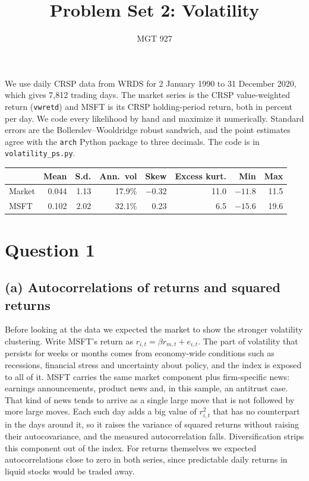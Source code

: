 \documentclass[11pt]{article}
\title{\textbf{Problem Set 2: Volatility}}
\author{MGT 927}  %
\date{}
\newcommand{\1}{\mathbf{1}}
\begin{document}
\maketitle
\vspace{-1.5em}

We use daily CRSP data from WRDS for 2 January 1990 to 31 December 2020, which gives 7,812
trading days. The market series is the CRSP value-weighted return (\texttt{vwretd}) and MSFT
is its CRSP holding-period return, both in percent per day. We code every likelihood by hand
and maximize it numerically. Standard errors are the Bollerslev--Wooldridge robust sandwich,
and the point estimates agree with the \texttt{arch} Python package to three decimals. The
code is in \texttt{volatility\_ps.py}.

\begin{center}
\small
\begin{tabular}{lrrrrrrr}
\toprule
 & Mean & S.d. & Ann.\ vol & Skew & Excess kurt. & Min & Max \\
\midrule
Market & 0.044 & 1.13 & 17.9\% & $-0.32$ & 11.0 & $-11.8$ & 11.5 \\
MSFT   & 0.102 & 2.02 & 32.1\% & 0.23 & 6.5 & $-15.6$ & 19.6 \\
\bottomrule
\end{tabular}
\end{center}

\section{Question 1}

\subsection{(a) Autocorrelations of returns and squared returns}

Before looking at the data we expected the market to show the stronger volatility clustering.
Write MSFT's return as $r_{i,t}=\beta r_{m,t}+e_{i,t}$. The part of volatility that persists
for weeks or months comes from economy-wide conditions such as recessions, financial stress
and uncertainty about policy, and the index is exposed to all of it. MSFT carries the same
market component plus firm-specific news: earnings announcements, product news and, in this
sample, an antitrust case. That kind of news tends to arrive as a single large move that is
not followed by more large moves. Each such day adds a big value of $r_{i,t}^2$ that has no
counterpart in the days around it, so it raises the variance of squared returns without
raising their autocovariance, and the measured autocorrelation falls. Diversification strips
this component out of the index. For returns themselves we expected autocorrelations close to
zero in both series, since predictable daily returns in liquid stocks would be traded away.
\end{document}

